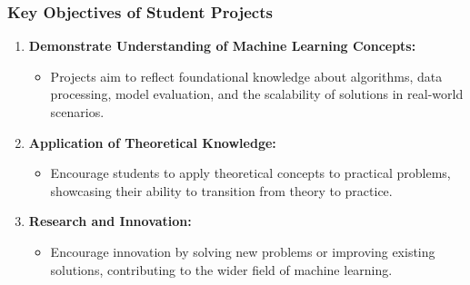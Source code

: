 \documentclass[aspectratio=169]{beamer}
\begin{document}
\begin{frame}[fragile]
    \frametitle{Key Objectives of Student Projects}
    \begin{enumerate}
        \item \textbf{Demonstrate Understanding of Machine Learning Concepts:}
        \begin{itemize}
            \item Projects aim to reflect foundational knowledge about algorithms, data processing, model evaluation, and the scalability of solutions in real-world scenarios.
        \end{itemize}
        
        \item \textbf{Application of Theoretical Knowledge:}
        \begin{itemize}
            \item Encourage students to apply theoretical concepts to practical problems, showcasing their ability to transition from theory to practice.
        \end{itemize}
        
        \item \textbf{Research and Innovation:}
        \begin{itemize}
            \item Encourage innovation by solving new problems or improving existing solutions, contributing to the wider field of machine learning.
        \end{itemize}
    \end{enumerate}
\end{frame}
\end{document}
